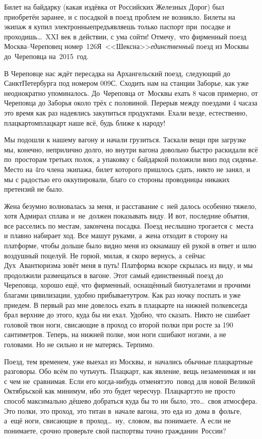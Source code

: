Билет на байдарку (какая издёвка от Российских Железных Дорог) был приобретён заранее, и с посадкой в поезд проблем не возникло. Билеты на экипаж я купил электронные\mdash предъявляешь только паспорт при~посадке и проходишь\ldots~XXI век в действии, с ума сойти! Отмечу,~что фирменный поезд Москва\nobreakdash--Череповец номер~126Я~<<Шексна>>\mdash \textit{единственный} поезд из Москвы до~Череповца на~2015~год. 
 
В Череповце нас ждёт пересадка на Архангельский поезд, следующий до Санкт\sdash Петербурга под номером 009С. Сходить нам на станции Заборье, как уже неоднократно упоминалось. До~Череповца от~Москвы ехать 8 часов примерно, от Череповца до Заборья около трёх с половиной. Перерыв между поездами 4 часа\mdash за это время как раз надеялись закупиться продуктами. Ехали везде, естественно, плацкартом\mdash плацкарт наше всё, будь ближе к народу! 

Мы подошли к нашему вагону и начали грузиться. Таскали вещи при загрузке мы, конечно, неприлично долго, но внутри вагона довольно быстро раскидали всё по~просторам третьих полок, а упаковку с байдаркой положили вниз под сиденье. Место на 4\sdash го члена экипажа, билет которого пришлось сдать, никто не занял, и мы с радостью его оккупировали, благо со стороны проводницы никаких претензий не было.

Жена безумно волновалась за меня, и расставание с~ней далось особенно тяжело, хотя Адмирал сплава и~не~должен показывать виду. И вот, последние объятия, все расселись по местам, закончена посадка. Поезд неслышно трогается с~места и плавно набирает ход. Все машут руками, а~жена отходит в сторону на платформе, чтобы дольше было видно меня из окна\mdash машу ей рукой в ответ и шлю воздушный поцелуй. Не горюй, милая, я скоро вернусь, а~сейчас Дух~Авантюризма зовёт меня в путь!
\newpage
Платформа вскоре скрылась из виду, и мы продолжили размещаться в вагоне. Этот самый единственный поезд до Череповца, хорошо ещё, что фирменный, оснащённый биотуалетами и прочими благами цивилизации, удобно прибывает\mdash утром. Как раз ночку поспать и уже приедем. В первый раз мне довелось ехать в плацкарте на нижней полке\mdash всегда брал верхние до этого, куда бы ни ехал. Удобно, что сказать. Никто не сшибает головой твои ноги, свисающие в проход со второй полки при росте за 190 сантиметров. Теперь, на нижней полке, мои ноги сшибают ногами, а не головами. Но не сильно и не матерясь. Терпимо. 

Поезд, тем временем, уже выехал из Москвы, и~начались обычные плацкартные разговоры.  Обо всём по чуть\sdash чуть. Плацкарт, как явление, вещь незаменимая и ни с чем не~сравнимая. Если его когда-нибудь отменят\mdash это~повод для новой Великой Октябрьской как минимум, ибо это будет чересчур. Плацкарт\mdash это не просто способ максимально дёшево добраться куда бы то ни было, это\ldots~своя атмосфера. Это полки, это проход, это титан в~начале вагона, это еда из~дома в~фольге, а~ещё ноги, свисающие в~проход\ldots~ну,~словом, вы понимаете. А если не понимаете, срочно проверьте свой паспорт\mdash вы точно гражданин~России? 

